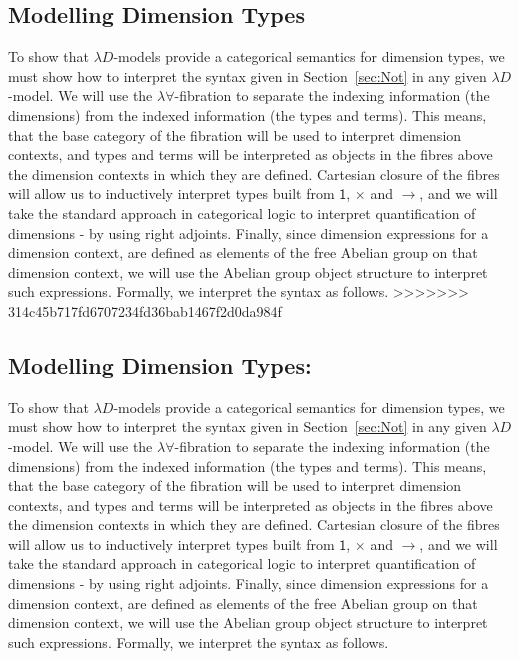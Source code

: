 \documentclass[a4paper,UKenglish]{lipics}
\newcommand{\msf}[1]{\mathsf{#1}} %
\newcommand{\unitTy}{\msf{1}}
\begin{document}
\subsection{Modelling Dimension Types}
To show that $\lambda D$-models provide a categorical semantics for dimension types, we must show how to interpret the syntax given in Section~\ref{sec:Not} in any given $\lambda D$-model. We will use the $\lambda \forall$-fibration to separate the indexing information (the dimensions) from the indexed information (the types and terms). This means, that the base category of the fibration will be used to interpret dimension contexts, and types and terms will be interpreted as objects in the fibres above the dimension contexts in which they are defined. Cartesian closure of the fibres will allow us to inductively interpret types built from $\unitTy$, $\times$ and $\rightarrow$, and we will take the standard approach in categorical logic to interpret quantification of dimensions - by using right adjoints. Finally, since dimension expressions for a dimension context, are defined as elements of the free Abelian group on that dimension context, we will use the Abelian group object structure to interpret such
expressions. Formally, we interpret the
syntax as follows.
>>>>>>> 314c45b717fd6707234fd36bab1467f2d0da984f


\subsection{Modelling Dimension Types:}
\noindent To show that $\lambda D$-models provide a categorical semantics for dimension types, we must show how to interpret the syntax given in Section~\ref{sec:Not} in any given $\lambda D$-model. We will use the $\lambda \forall$-fibration to separate the indexing information (the dimensions) from the indexed information (the types and terms). This means, that the base category of the fibration will be used to interpret dimension contexts, and types and terms will be interpreted as objects in the fibres above the dimension contexts in which they are defined. Cartesian closure of the fibres will allow us to inductively interpret types built from $\unitTy$, $\times$ and $\rightarrow$, and we will take the standard approach in categorical logic to interpret quantification of dimensions - by using right adjoints. Finally, since dimension expressions for a dimension context, are defined as elements of the free Abelian group on that dimension context, we will use the Abelian group object structure to interpret
such expressions. Formally, we interpret the syntax as follows.
\end{document}
